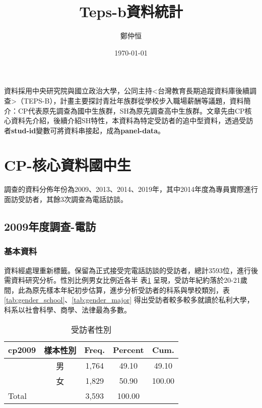 \documentclass[12pt, a4paper]{article}
\title{ Teps-b資料統計}
\author{{\SM 鄭仲恒}}
\date{{\TT \today}}
\begin{document}
\maketitle
\fontsize{12}{22 pt}\selectfont
資料採用中央研究院與國立政治大學，公同主持<台灣教育長期追蹤資料庫後續調查>（TEPS-B），計畫主要探討青壯年族群從學校步入職場薪酬等議題，資料簡介：CP代表原先調查為國中生族群，SH為原先調查高中生族群。文章先由CP核心資料先介紹，後續介紹SH特性，本資料為特定受訪者的追中型資料，透過受訪者\textbf{stud-id}變數可將資料串接起，成為\textbf{panel-data}。



\section{CP-核心資料國中生}
調查的資料分佈年份為2009、2013、2014、2019年，其中2014年度為專員實際進行面訪受訪者，其餘3次調查為電話訪談。
\subsection{2009年度調查-電訪}

\subsubsection{基本資料}
資料經處理重新標籤。保留為正式接受完電話訪談的受訪者，總計3593位，進行後需資料研究分析。性別比例男女比例近各半 表\ref{tab:gender} 呈現，受訪年紀約落於20-21歲間，此為原先樣本年紀初步估算，進步分析受訪者的科系與學校類別，表 \ref{tab:gender_school}、\ref{tab:gender_major} 得出受訪者較多較多就讀於私利大學，科系以社會科學、商學、法律最為多數。


\begin{table}[htbp]
  \centering
   \caption{受訪者性別}
  \begin{adjustbox}{width=0.5\textwidth}
    \begin{tabular}{lcccc}
      \toprule
      cp2009 & 樣本性別 & Freq. & Percent & Cum. \\
      \midrule
      & 男 & 1,764 & 49.10 & 49.10 \\
      & 女 & 1,829 & 50.90 & 100.00 \\
      \midrule
      Total & & 3,593 & 100.00 & \\
      \bottomrule
    \end{tabular}
    \label{tab:gender}
  \end{adjustbox}
\end{table}
\end{document}
